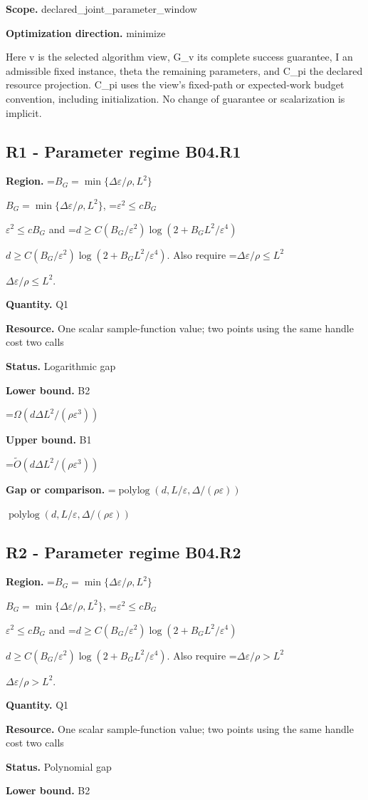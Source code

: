 \documentclass[10pt,a4paper]{article}
\newcommand{\AtlasMath}[1]{\par\begingroup\centering\setbox0=\hbox{$\displaystyle #1$}\ifdim\wd0>1.4\linewidth\typeout{ATLAS WIDE FORMULA: \the\wd0}\fi\ifdim\wd0>\linewidth\resizebox{\linewidth}{!}{\box0}\else\box0\fi\par\endgroup}
\newcommand{\AtlasInlineMath}[1]{\begingroup\setbox0=\hbox{$#1$}\ifdim\wd0>.4\linewidth\endgroup\AtlasMath{#1}\else\endgroup$#1$\fi}
\begin{document}
\textbf{Scope.} declared\_joint\_parameter\_window

\textbf{Optimization direction.} minimize

Here v is the selected algorithm view, G\_v its complete success guarantee, I an admissible fixed instance, theta the remaining parameters, and C\_pi the declared resource projection. C\_pi uses the view's fixed-path or expected-work budget convention, including initialization. No change of guarantee or scalarization is implicit.

\subsection{R1 - Parameter regime B04.R1}
\textbf{Region.} \AtlasInlineMath{B_G=\min\{\Delta\varepsilon/\rho,L^2\}}, \AtlasInlineMath{\varepsilon^2\le cB_G} and \AtlasInlineMath{d\ge C(B_G/\varepsilon^2)\log(2+B_GL^2/\varepsilon^4)}. Also require \AtlasInlineMath{\Delta\varepsilon/\rho\le L^2}.

\textbf{Quantity.} Q1

\textbf{Resource.} One scalar sample-function value; two points using the same handle cost two calls

\textbf{Status.} Logarithmic gap

\textbf{Lower bound.} B2

\AtlasMath{\Omega(d\Delta L^2/(\rho\varepsilon^3))}
\textbf{Upper bound.} B1

\AtlasMath{\widetilde{O}(d\Delta L^2/(\rho\varepsilon^3))}
\textbf{Gap or comparison.} \AtlasInlineMath{\operatorname{polylog}(d,L/\varepsilon,\Delta/(\rho\varepsilon))}

\subsection{R2 - Parameter regime B04.R2}
\textbf{Region.} \AtlasInlineMath{B_G=\min\{\Delta\varepsilon/\rho,L^2\}}, \AtlasInlineMath{\varepsilon^2\le cB_G} and \AtlasInlineMath{d\ge C(B_G/\varepsilon^2)\log(2+B_GL^2/\varepsilon^4)}. Also require \AtlasInlineMath{\Delta\varepsilon/\rho>L^2}.

\textbf{Quantity.} Q1

\textbf{Resource.} One scalar sample-function value; two points using the same handle cost two calls

\textbf{Status.} Polynomial gap

\textbf{Lower bound.} B2
\end{document}
